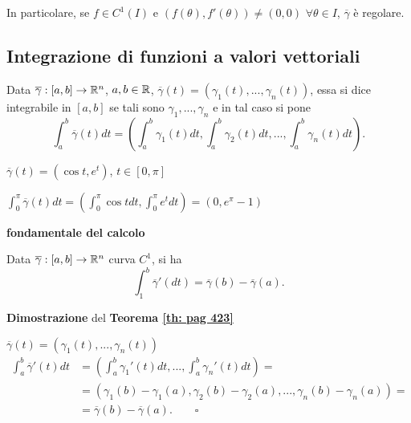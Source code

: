 In particolare, se $f \in C^1(I)$ e $(f(\theta), f'(\theta))\neq (0,0)\,\, \forall \theta \in I$, $\overline{\gamma}$ è regolare.


\subsection{Integrazione di funzioni a valori vettoriali}

\begin{definition}
	Data $\overline{\gamma}:[a,b]\rightarrow \mathbb{R}^n$, $a,b\in \mathbb{R}$, $\overline{\gamma}(t)=(\gamma_1(t),...,\gamma_n(t))$, essa si dice integrabile in $[a,b]$ se tali sono $\gamma_1,...,\gamma_n$ e in tal caso si pone
	\begin{equation*}
		\int_{a}^{b}\overline{\gamma}(t)dt=\left(\int_{a}^{b}\gamma_1(t)dt,\int_{a}^{b}\gamma_2(t)dt,...,\int_{a}^{b}\gamma_n(t)dt\right).
	\end{equation*}
\end{definition}


\begin{exbar}
	{\centering $\overline{\gamma}(t)=(\cos t , e^t)$, $t \in [0,\pi]$
		
	$\int_{0}^\pi \overline{\gamma}(t)dt=\left( \int_0^\pi \cos t dt, \int_0^\pi e^t dt \right)=(0,e^\pi-1)$
	\par}
\end{exbar}


\begin{theorem} \textbf{fondamentale del calcolo}
	
	\label{th: pag 423}
	Data $\overline{\gamma}:[a,b]\rightarrow \mathbb{R}^n$ curva $C^1$, si ha
	\begin{equation*}
		\int_1^b\overline{\gamma}'(dt)=\overline{\gamma}(b)-\overline{\gamma}(a).
	\end{equation*}	
\end{theorem}


\begin{dembar}
	\textbf{Dimostrazione} del \textbf{Teorema \ref{th: pag 423}}
	
	$\overline{\gamma}(t)=(\gamma_1(t),...,\gamma_n(t))$
	\begin{align*}
		\int_a^b\overline{\gamma}'(t)dt&=\left( \int_a^b \gamma_1'(t)dt,...,\int_a^b \gamma_n'(t)dt \right)=
		\\
		&=\left( \gamma_1(b)-\gamma_1(a),\gamma_2(b)-\gamma_2(a),...,\gamma_n(b)-\gamma_n(a)\right)=
		\\
		&=\overline{\gamma}(b)-\overline{\gamma}(a). \qquad \square
	\end{align*}
\end{dembar}


